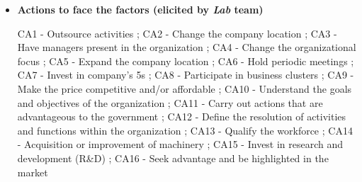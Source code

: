 \begin{itemize}
\item \textbf{Actions to face the factors (elicited by \textit{Lab} team)}

CA1 - Outsource activities
;  CA2 - Change the company location
;  CA3 - Have managers present in the organization
;  CA4 - Change the organizational focus
;  CA5 - Expand the company location
;  CA6 - Hold periodic meetings
;  CA7 - Invest in company's 5s
;  CA8 - Participate in business clusters
;  CA9 - Make the price competitive and/or affordable
;  CA10 - Understand the goals and objectives of the organization
;  CA11 - Carry out actions that are advantageous to the government
;  CA12 - Define the resolution of activities and functions within the organization
;  CA13 - Qualify the workforce
;  CA14 - Acquisition or improvement of machinery
;  CA15 - Invest in research and development (R\&D)
;  CA16 - Seek advantage and be highlighted in the market
\end{itemize}






